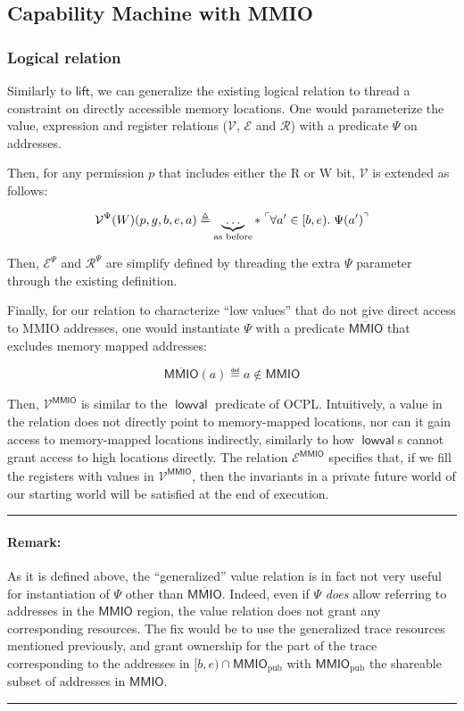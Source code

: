 \documentclass{article}
\newcommand{\X}[1]{\ensuremath{\mathrm{#1}}}
\newcommand{\Sf}[1]{\ensuremath{\mathsf{#1}}}
\newcommand{\pure}[1]{\tensor[^{\ulcorner}]{#1{}}{^{\urcorner}}} %
\newcommand{\MMIO}{\Sf{MMIO}\xspace}
\DeclareMathOperator{\lowval}{\Sf{lowval}}
\newenvironment{remark}
{ \bigskip\hrule\vspace{-1.3em}\nobreak
  \paragraph*{Remark:}}
{\vspace*{0.5em}\hrule\medskip}
\begin{document}
\subsection{Capability Machine with MMIO}

\subsubsection{Logical relation}

\newcommand{\VR}{\mathcal{V}}
\newcommand{\ER}{\mathcal{E}}
\newcommand{\RR}{\mathcal{R}}
\newcommand{\notMMIO}{\overline{\MMIO}}

Similarly to $\Sf{lift}$, we can generalize the existing logical relation
to thread a constraint on directly accessible memory locations. One would
parameterize the value, expression and register relations ($\VR$, $\ER$ and $\RR$)
with a predicate $\Psi$ on addresses.

Then, for any permission $p$ that includes either the R or W bit, $\VR$
is extended as follows:

\[
  \VR^{\Psi}(W)(p, g, b, e, a) \eqdef \underbrace{\ldots}_{\text{as before}} \ast \; \pure{\forall a' \in [b,e).\; \Psi(a')}
\]

Then, $\ER^{\Psi}$ and $\RR^{\Psi}$ are simplify defined by threading the extra
$\Psi$ parameter through the existing definition.

Finally, for our relation to characterize ``low values'' that do not give direct
access to MMIO addresses, one would instantiate $\Psi$ with a predicate
$\notMMIO$ that excludes memory mapped addresses:

\[
  \notMMIO(a) \eqdef a \notin \MMIO
\]

Then, $\VR^{\notMMIO}$ is similar to the $\lowval$ predicate of OCPL.
Intuitively, a value in the relation does not directly point to memory-mapped
locations, nor can it gain access to memory-mapped locations indirectly,
similarly to how $\lowval$s cannot grant access to high locations
directly. The relation $\ER^{\notMMIO}$ specifies that, if we fill the registers
with values in $\VR^{\notMMIO}$, then the invariants in a private future world
of our starting world will be satisfied at the end of execution.

\begin{remark} As it is defined above, the ``generalized'' value relation
is in fact not very useful for instantiation of $\Psi$ other than $\notMMIO$.
Indeed, even if $\Psi$ \emph{does} allow referring to addresses in the $\MMIO$
region, the value relation does not grant any corresponding resources. The fix
would be to use the generalized trace resources mentioned previously, and grant
ownership for the part of the trace corresponding to the addresses in
$[b,e) \cap \MMIO_{\X{pub}}$ with $\MMIO_{\X{pub}}$ the shareable subset of
addresses in \MMIO.
\end{remark}
\end{document}
